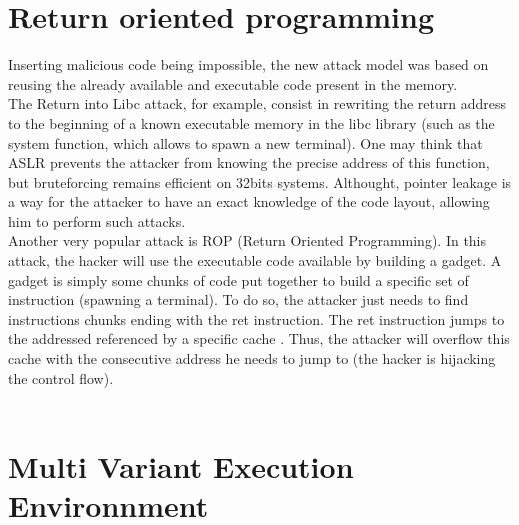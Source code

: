 \documentclass[english]{enstaPRE}
\begin{document}
\section{Return oriented programming}
Inserting malicious code being impossible, the new attack model was based on reusing the already available and executable code present
in the memory. \\ The Return into Libc attack, for example, consist in rewriting the return address to the beginning of a known
executable memory in the libc library (such as the system function, which allows to spawn a new terminal). One may think that ASLR
prevents the attacker from knowing the precise address of this function, but bruteforcing remains efficient on 32bits systems.
Althought, pointer leakage is a way for the attacker to have an exact knowledge of the code layout, allowing him to perform such attacks.
\\
Another very popular attack is ROP (Return Oriented Programming). In this attack, the hacker will use the executable code available 
by building a gadget. A gadget is simply some chunks of code put together to build a specific set of instruction (spawning a terminal).
To do so, the attacker just needs to find instructions chunks ending with the ret instruction. The ret instruction jumps to the addressed
referenced by a specific cache \cite{warInMemory}. Thus, the attacker will overflow this cache with the consecutive address he needs to jump to 
(the hacker is hijacking the control flow).
\\ \\

\section{Multi Variant Execution Environnment}
\end{document}
